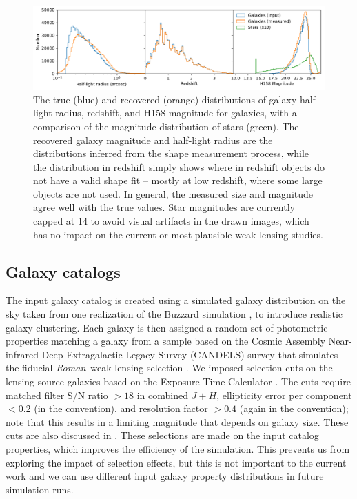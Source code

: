 \documentclass[usenatbib]{mnras}
\newcommand{\wfirst}{{\slshape Roman}}
\begin{document}
\begin{figure}
\begin{center}
\includegraphics[width=\textwidth]{figures/hist.pdf}
\end{center}
\caption[]{
The true (blue) and recovered (orange) distributions of galaxy half-light radius, redshift, and H158 magnitude for galaxies, with a comparison of the magnitude distribution of stars (green). The recovered galaxy magnitude and half-light radius are the distributions inferred from the shape measurement process, while the distribution in redshift simply shows where in redshift objects do not have a valid shape fit -- mostly at low redshift, where some large objects are not used. In general, the measured size and magnitude agree well with the true values. Star magnitudes are currently capped at 14 to avoid visual artifacts in the drawn images, which has no impact on the current or most plausible weak lensing studies.
\label{fig:hist}}
\end{figure}

\subsection{Galaxy catalogs}\label{galcats}

The input galaxy catalog is created using a simulated galaxy distribution on the sky taken from one realization of the Buzzard simulation \citep{2019arXiv190102401D,wechsler2019}, to introduce realistic galaxy clustering. 
Each galaxy is then assigned a random set of photometric properties matching a galaxy from a sample based on the Cosmic Assembly Near-infrared Deep Extragalactic Legacy Survey (CANDELS) survey that simulates the fiducial \wfirst\ weak lensing selection \citep{2019ApJ...877..117H}. We imposed selection cuts on the lensing source galaxies based on the Exposure Time Calculator \citep{2012arXiv1204.5151H}. The cuts require matched filter S/N ratio $>18$ in combined $J+H$, ellipticity error per component $<0.2$ (in the \citealt{2002AJ....123..583B} convention), and resolution factor $>0.4$ (again in the \citealt{2002AJ....123..583B} convention); note that this results in a limiting magnitude that depends on galaxy size. These cuts are also discussed in \cite{2019ApJ...877..117H}. These selections are made on the input catalog properties, which improves the efficiency of the simulation. This prevents us from exploring the impact of selection effects, but this is not important to the current work and we can use different input galaxy property distributions in future simulation runs.
\end{document}
